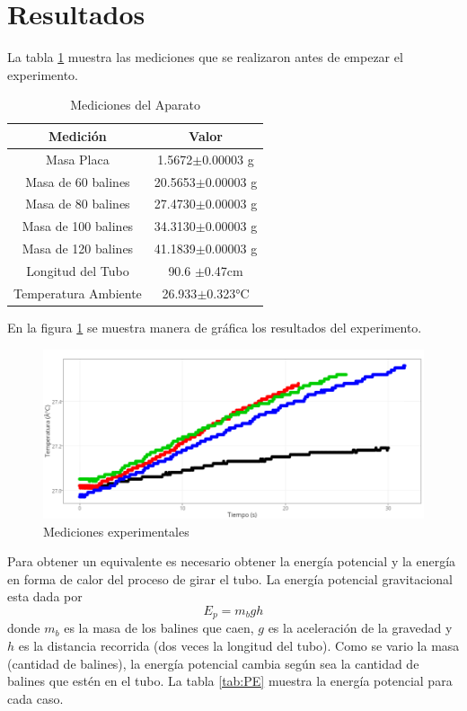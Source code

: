 \documentclass[12pt]{article}
\begin{document}
\section{Resultados}
La tabla \ref{tab:Med} muestra las mediciones que se realizaron antes de empezar el experimento.

	\begin{table}[H]
		\centering
		\begin{tabular}{|c|c|}
			\hline
			\textbf{Medición} & \textbf{Valor} \\ \hline
			 Masa Placa & 1.5672$\pm$0.00003 g \\ \hline
			 Masa de 60 balines & 20.5653$\pm$0.00003 g \\ \hline
			 Masa de 80 balines & 27.4730$\pm$0.00003 g \\ \hline
			 Masa de 100 balines & 34.3130$\pm$0.00003 g \\ \hline
			 Masa de 120 balines & 41.1839$\pm$0.00003 g \\ \hline
			 Longitud del Tubo & 90.6 $\pm$0.47cm  \\ \hline
			 Temperatura Ambiente & 26.933$\pm$0.323°C \\ \hline
		\end{tabular}
		\caption{Mediciones del Aparato}
		\label{tab:Med}
	\end{table}
	
En la figura \ref{fig:med} se muestra manera de gráfica los resultados del experimento.

	\begin{figure}[H]
		\centering
		\includegraphics[width = 0.75\linewidth]{medi.png}
		\caption{Mediciones experimentales}
		\label{fig:med}
	\end{figure}

Para obtener un equivalente es necesario obtener la energía potencial y la energía en forma de calor del proceso de girar el tubo. La energía potencial gravitacional esta dada por 
\begin{equation}
\label{eq:poten}
E_p = m_bgh
\end{equation}
donde $m_b$ es la masa de los balines que caen, $g$ es la aceleración de la gravedad y $h$ es la distancia recorrida (dos veces la longitud del tubo). Como se vario la masa (cantidad de balines), la energía potencial cambia según sea la cantidad de balines que estén en el tubo. La tabla \ref{tab:PE} muestra la energía potencial para cada caso.
	
\end{document}
